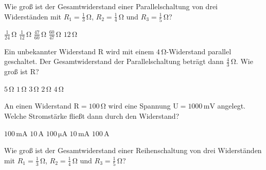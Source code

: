\documentclass[11pt]{exam}
\begin{document}
\setlength{\voffset}{-0.5in}
\setlength{\headsep}{5pt}

\hspace{2mm}
 \hspace{5mm}
\vspace{4mm}

\begin{questions}

\question Wie groß ist der Gesamtwiderstand einer Parallelschaltung von drei Widerständen mit \(R_1=\mathrm{\frac{1}{3}\,\Omega}\), \(R_2=\mathrm{\frac{1}{4}\,\Omega}\) und \(R_3=\mathrm{\frac{1}{5}\,\Omega}\)?

\begin{choices}
	\choice \(\mathrm{\frac{1}{24}\,\Omega}\)
	\choice \(\mathrm{\frac{1}{12}\,\Omega}\)
	\choice \(\mathrm{\frac{47}{60}\,\Omega}\)
	\choice \(\mathrm{\frac{60}{47}\,\Omega}\)
	\choice \(\mathrm{12\,\Omega}\)
\end{choices}

\vspace{3mm}\question Ein unbekannter Widerstand \(\mathrm{R}\) wird mit einem \(\mathrm{4\,\Omega}\)-Widerstand parallel geschaltet. Der Gesamtwiderstand der Parallelschaltung beträgt dann \(\mathrm{\frac{4}{3}\,\Omega}\). Wie groß ist \(\mathrm{R}\)?

\begin{choices}
	\choice \(\mathrm{5\,\Omega}\)
	\choice \(\mathrm{1\,\Omega}\)
	\choice \(\mathrm{3\,\Omega}\)
	\choice \(\mathrm{2\,\Omega}\)
	\choice \(\mathrm{4\,\Omega}\)
\end{choices}

\vspace{3mm}\question An einen Widerstand \(\mathrm{R=100\,\Omega}\) wird eine Spannung \(\mathrm{U=1000\,mV}\) angelegt. Welche Stromstärke fließt dann durch den Widerstand?

\begin{choices}
	\choice \(\mathrm{100\,mA}\)
	\choice \(\mathrm{10\,A}\)
	\choice \(\mathrm{100\,\mu A}\)
	\choice \(\mathrm{10\,mA}\)
	\choice \(\mathrm{100\,A}\)
\end{choices}

\vspace{3mm}\question Wie groß ist der Gesamtwiderstand einer Reihenschaltung von drei Widerständen mit \(R_1=\mathrm{\frac{1}{3}\,\Omega}\), \(R_2=\mathrm{\frac{1}{4}\,\Omega}\) und \(R_3=\mathrm{\frac{1}{5}\,\Omega}\)?


\end{questions}
\end{document}
